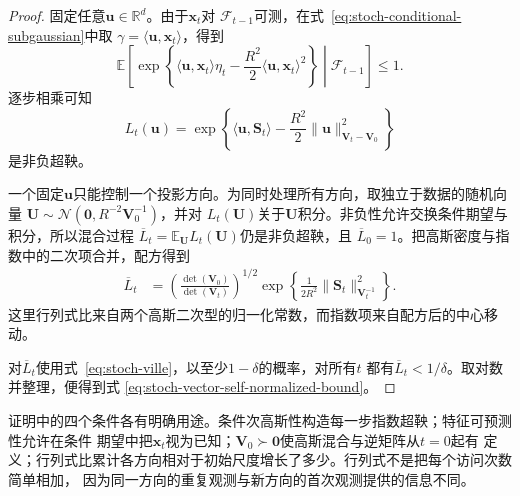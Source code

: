 \begin{proof}
固定任意$\bm{u}\in\mathbb{R}^d$。由于$\bm{x}_t$对
$\mathcal{F}_{t-1}$可测，在式~\eqref{eq:stoch-conditional-subgaussian}中取
$\gamma=\langle\bm{u},\bm{x}_t\rangle$，得到
\[
  \mathbb{E}\!\left[
    \exp\left\{
      \langle\bm{u},\bm{x}_t\rangle\eta_t
      -\frac{R^2}{2}
       \langle\bm{u},\bm{x}_t\rangle^2
    \right\}
    \middle|\mathcal{F}_{t-1}
  \right]
  \leq1.
  \]
逐步相乘可知
\[
  L_t(\bm{u})
  =
  \exp\left\{
    \langle\bm{u},\bm{S}_t\rangle
    -\frac{R^2}{2}
     \lVert\bm{u}\rVert_{\bm{V}_t-\bm{V}_0}^2
  \right\}
\]
是非负超鞅。

一个固定$\bm{u}$只能控制一个投影方向。为同时处理所有方向，取独立于数据的随机向量
$\bm{U}\sim\mathcal{N}(\bm{0},R^{-2}\bm{V}_0^{-1})$，并对
$L_t(\bm{U})$关于$\bm{U}$积分。非负性允许交换条件期望与积分，所以混合过程
$\overline L_t=\mathbb{E}_{\bm{U}}L_t(\bm{U})$仍是非负超鞅，且
$\overline L_0=1$。把高斯密度与指数中的二次项合并，配方得到
\begin{align*}
  \overline L_t
  &=
  \left(
    \frac{\det(\bm{V}_0)}
         {\det(\bm{V}_t)}
  \right)^{1/2}
  \exp\left\{
    \frac{1}{2R^2}
    \lVert\bm{S}_t\rVert_{\bm{V}_t^{-1}}^2
  \right\}.
\end{align*}
这里行列式比来自两个高斯二次型的归一化常数，而指数项来自配方后的中心移动。

对$\overline L_t$使用式~\eqref{eq:stoch-ville}，以至少$1-\delta$的概率，对所有$t$
都有$\overline L_t<1/\delta$。取对数并整理，便得到式
\eqref{eq:stoch-vector-self-normalized-bound}。
\end{proof}

证明中的四个条件各有明确用途。条件次高斯性构造每一步指数超鞅；特征可预测性允许在条件
期望中把$\bm{x}_t$视为已知；$\bm{V}_0\succ\bm{0}$使高斯混合与逆矩阵从$t=0$起有
定义；行列式比累计各方向相对于初始尺度增长了多少。行列式不是把每个访问次数简单相加，
因为同一方向的重复观测与新方向的首次观测提供的信息不同。


